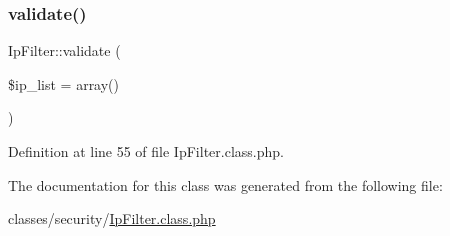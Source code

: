 \subsubsection{\texorpdfstring{validate()}{validate()}}
{\footnotesize\ttfamily Ip\+Filter\+::validate (\begin{DoxyParamCaption}\item[{}]{\$ip\+\_\+list = {\ttfamily array()} }\end{DoxyParamCaption})}



Definition at line 55 of file Ip\+Filter.\+class.\+php.



The documentation for this class was generated from the following file\+:\begin{DoxyCompactItemize}
\item 
classes/security/\hyperlink{IpFilter_8class_8php}{Ip\+Filter.\+class.\+php}\end{DoxyCompactItemize}
